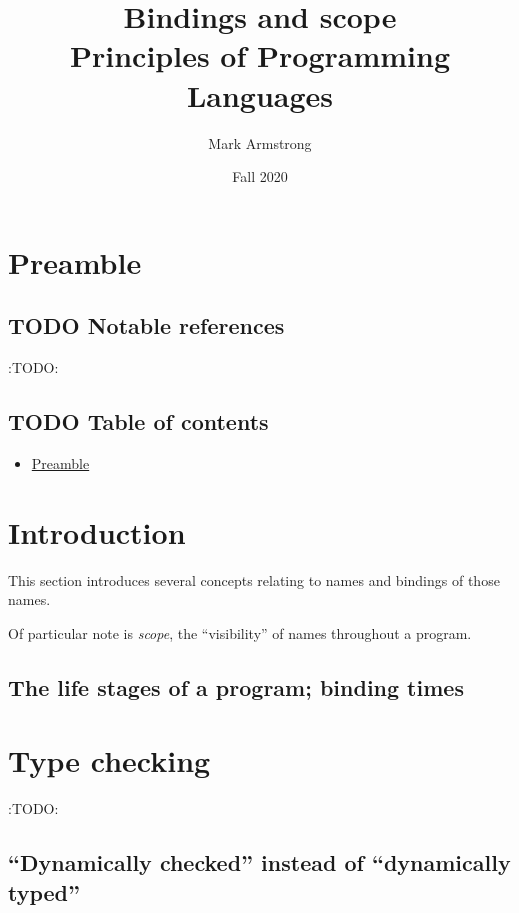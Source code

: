 \documentclass[11pt]{article}
\author{Mark Armstrong}
\date{Fall 2020}
\title{Bindings and scope\\\medskip
\large Principles of Programming Languages}
\theoremstyle{definition}
\begin{document}
\maketitle

\section{Preamble}
\label{sec:org5db724a}

\subsection{{\bfseries\sffamily TODO} Notable references}
\label{sec:org06e1ffa}

:TODO:

\subsection{{\bfseries\sffamily TODO} Table of contents}
\label{sec:org1e20969}

\begin{scriptsize}
\begin{itemize}
\item \hyperref[sec:org5db724a]{Preamble}
\end{itemize}
\end{scriptsize}

\section{Introduction}
\label{sec:org1bda082}

This section introduces several concepts
relating to names and bindings of those names.

Of particular note is \emph{scope}, the “visibility” of names
throughout a program.

\subsection{The life stages of a program; binding times}
\label{sec:org7da1a3a}

\section{Type checking}
\label{sec:org24b54e2}

:TODO:

\subsection{“Dynamically checked” instead of “dynamically typed”}
\label{sec:org5278f72}
\end{document}
